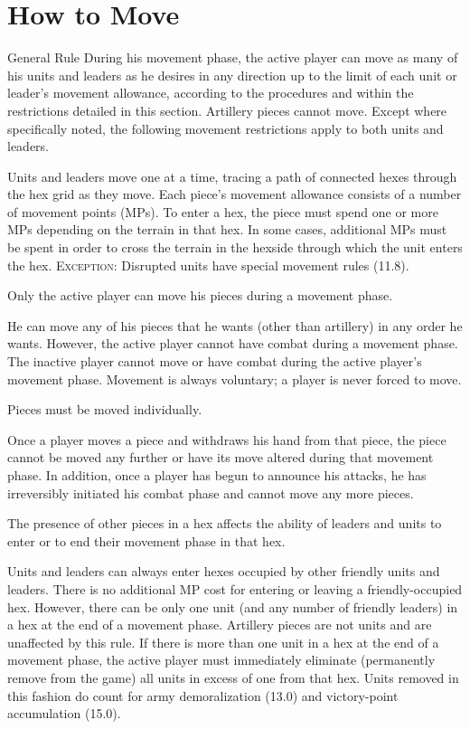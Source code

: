 \section{How to Move}

\begin{rulebox}{General Rule}
During his movement phase, the active player can move as many of his units and leaders as he desires in any direction up to the limit of each unit or leader's movement allowance, according to the procedures and within the restrictions detailed in this section. Artillery pieces cannot move. Except where specifically noted, the following movement restrictions apply to both units and leaders.
\end{rulebox}


Units and leaders move one at a time, tracing a path of connected hexes through the hex grid as they move. Each piece's movement allowance consists of a number of movement points (MPs). To enter a hex, the piece must spend one or more MPs depending on the terrain in that hex. In some cases, additional MPs must be spent in order to cross the terrain in the hexside through which the unit enters the hex. \textsc{Exception:} Disrupted units have special movement rules (11.8).

 Only the active player can move his pieces during a movement phase.

He can move any of his pieces that he wants (other than artillery) in any order he wants. However, the active player cannot have combat during a movement phase. The inactive player cannot move or have combat during the active player's movement phase. Movement is always voluntary; a player is never forced to move.

 Pieces must be moved individually.

Once a player moves a piece and withdraws his hand from that piece, the piece cannot be moved any further or have its move altered during that movement phase. In addition, once a player has begun to announce his attacks, he has irreversibly initiated his combat phase and cannot move any more pieces.

 The presence of other pieces in a hex affects the ability of leaders and units to enter or to end their movement phase in that hex.

Units and leaders can always enter hexes occupied by other friendly units and leaders. There is no additional MP cost for entering or leaving a friendly-occupied hex. However, there can be only one unit (and any number of friendly leaders) in a hex at the end of a movement phase. Artillery pieces are not units and are unaffected by this rule. If there is more than one unit in a hex at the end of a movement phase, the active player must immediately eliminate (permanently remove from the game) all units in excess of one from that hex. Units removed in this fashion do count for army demoralization (13.0) and victory-point accumulation (15.0).

